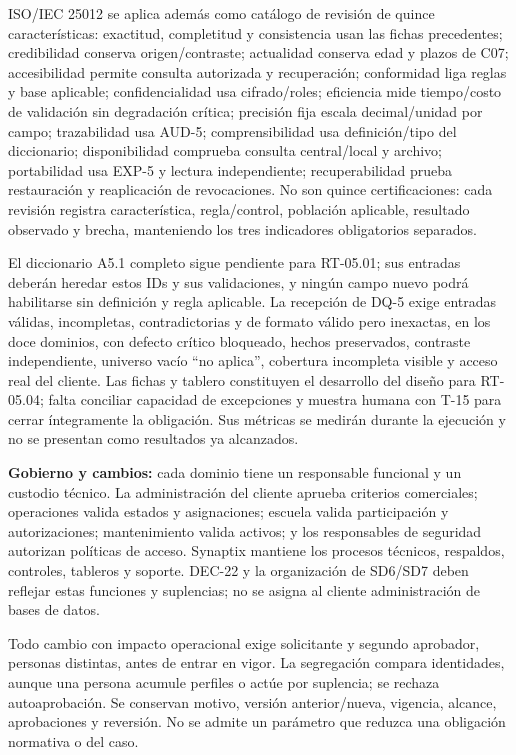ISO/IEC 25012 se aplica además como catálogo de revisión de quince características: exactitud, completitud y consistencia usan las fichas precedentes; credibilidad conserva origen/contraste; actualidad conserva edad y plazos de C07; accesibilidad permite consulta autorizada y recuperación; conformidad liga reglas y base aplicable; confidencialidad usa cifrado/roles; eficiencia mide tiempo/costo de validación sin degradación crítica; precisión fija escala decimal/unidad por campo; trazabilidad usa AUD-5; comprensibilidad usa definición/tipo del diccionario; disponibilidad comprueba consulta central/local y archivo; portabilidad usa EXP-5 y lectura independiente; recuperabilidad prueba restauración y reaplicación de revocaciones. No son quince certificaciones: cada revisión registra característica, regla/control, población aplicable, resultado observado y brecha, manteniendo los tres indicadores obligatorios separados.

El diccionario A5.1 completo sigue pendiente para RT-05.01; sus entradas deberán heredar estos IDs y sus validaciones, y ningún campo nuevo podrá habilitarse sin definición y regla aplicable. La recepción de DQ-5 exige entradas válidas, incompletas, contradictorias y de formato válido pero inexactas, en los doce dominios, con defecto crítico bloqueado, hechos preservados, contraste independiente, universo vacío ``no aplica'', cobertura incompleta visible y acceso real del cliente. Las fichas y tablero constituyen el desarrollo del diseño para RT-05.04; falta conciliar capacidad de excepciones y muestra humana con T-15 para cerrar íntegramente la obligación. Sus métricas se medirán durante la ejecución y no se presentan como resultados ya alcanzados.

\textbf{Gobierno y cambios:} cada dominio tiene un responsable funcional y un custodio técnico. La administración del cliente aprueba criterios comerciales; operaciones valida estados y asignaciones; escuela valida participación y autorizaciones; mantenimiento valida activos; y los responsables de seguridad autorizan políticas de acceso. Synaptix mantiene los procesos técnicos, respaldos, controles, tableros y soporte. DEC-22 y la organización de SD6/SD7 deben reflejar estas funciones y suplencias; no se asigna al cliente administración de bases de datos.

Todo cambio con impacto operacional exige solicitante y segundo aprobador, personas distintas, antes de entrar en vigor. La segregación compara identidades, aunque una persona acumule perfiles o actúe por suplencia; se rechaza autoaprobación. Se conservan motivo, versión anterior/nueva, vigencia, alcance, aprobaciones y reversión. No se admite un parámetro que reduzca una obligación normativa o del caso.
